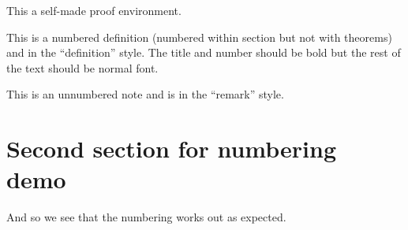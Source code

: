 \begin{ProofOri}
This a self-made proof environment.
\end{ProofOri}

\begin{definition}
This is a numbered definition (numbered within section but not with theorems) and in the ``definition'' style. The title and number should be bold but the rest of the text should be normal font.
\end{definition}

\begin{note}
This is an unnumbered note and is in the ``remark'' style.
\end{note}

\section{Second section for numbering demo}

\begin{theorem}
And so we see that the numbering works out as expected.
\end{theorem}


